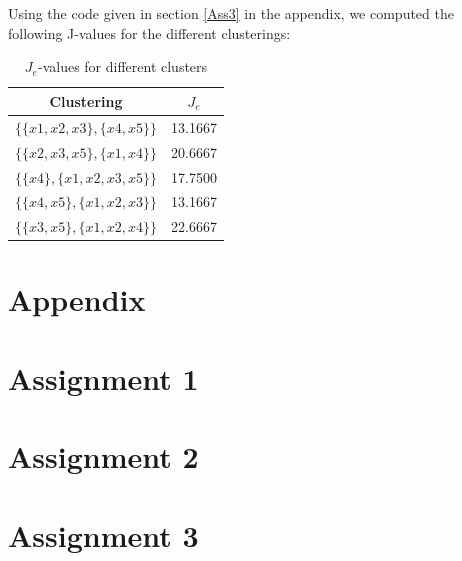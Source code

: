 \documentclass[10pt]{article}
\begin{document}
\section{}
Using the code given in section \ref{Ass3} in the appendix, we computed the following J-values for the different clusterings:
\begin{table}
	\centering
	\caption{$J_e$-values for different clusters}
	\label{tab1}
	\begin{tabular}{c|c}
		Clustering & $J_e$ \\
		\hline
		$\{\{x1, x2, x3\}, \{x4, x5\}\}$ & 13.1667\\
		$\{\{x2, x3, x5\}, \{x1, x4\}\}$ & 20.6667\\
		$\{\{x4\}, \{x1, x2, x3, x5\}\}$ & 17.7500\\
		$\{\{x4, x5\}, \{x1, x2, x3\}\}$ & 13.1667\\
		$\{\{x3, x5\}, \{x1, x2, x4\}\}$ & 22.6667
	\end{tabular}
\end{table}



\newpage
\section*{Appendix}
\appendix
\section{Assignment 1}
{\label{Minkowski}}
\section{Assignment 2}
{\label{Ass2}}
\section{Assignment 3}
{\label{Ass3}}
\end{document}

